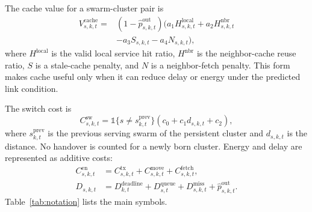 The cache value for a swarm-cluster pair is
\begin{align}
V^{\mathrm{cache}}_{s,k,t}={}&\left(1-\hat{p}^{\mathrm{out}}_{s,k,t}\right)
\Big(a_1H^{\mathrm{local}}_{s,k,t}+a_2H^{\mathrm{nbr}}_{s,k,t} \nonumber\\
&-a_3S_{s,k,t}-a_4N_{s,k,t}\Big),
\label{eq:cache_value}
\end{align}
where $H^{\mathrm{local}}$ is the valid local service hit ratio, $H^{\mathrm{nbr}}$ is the neighbor-cache reuse ratio, $S$ is a stale-cache penalty, and $N$ is a neighbor-fetch penalty. This form makes cache useful only when it can reduce delay or energy under the predicted link condition.

The switch cost is
\begin{equation}
C^{\mathrm{sw}}_{s,k,t}=\mathbb{1}\{s\neq s^{\mathrm{prev}}_{k,t}\}\left(c_0+c_1d_{s,k,t}+c_2\right),
\label{eq:switch_cost}
\end{equation}
where $s^{\mathrm{prev}}_{k,t}$ is the previous serving swarm of the persistent cluster and $d_{s,k,t}$ is the distance. No handover is counted for a newly born cluster. Energy and delay are represented as additive costs:
\begin{align}
C^{\mathrm{en}}_{s,k,t} &= C^{\mathrm{tx}}_{s,k,t}+C^{\mathrm{move}}_{s,k,t}+C^{\mathrm{fetch}}_{s,k,t},\label{eq:energy_cost}\\
D_{s,k,t} &= D^{\mathrm{deadline}}_{k,t}+D^{\mathrm{queue}}_{s,t}+D^{\mathrm{miss}}_{s,k,t}+\hat{p}^{\mathrm{out}}_{s,k,t}.\label{eq:delay_cost}
\end{align}
Table~\ref{tab:notation} lists the main symbols.


